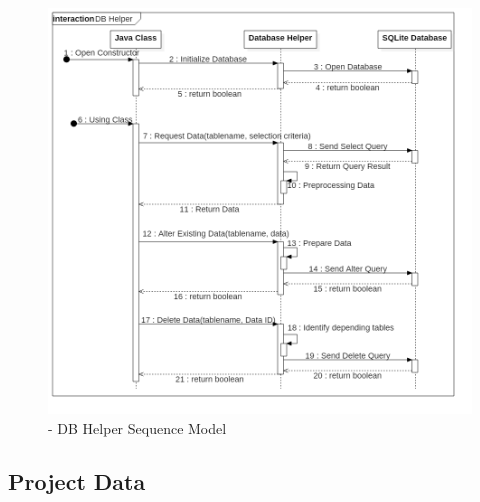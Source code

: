\begin{figure}[h] 
	\centering 
	\includegraphics[width=14cm]{images/DBHelper.png} 
	\caption{- DB Helper Sequence Model} 
	\label{fig:sequenceDBHelper}
\end{figure}
\subsection{Project Data}\label{projectcomponent}

